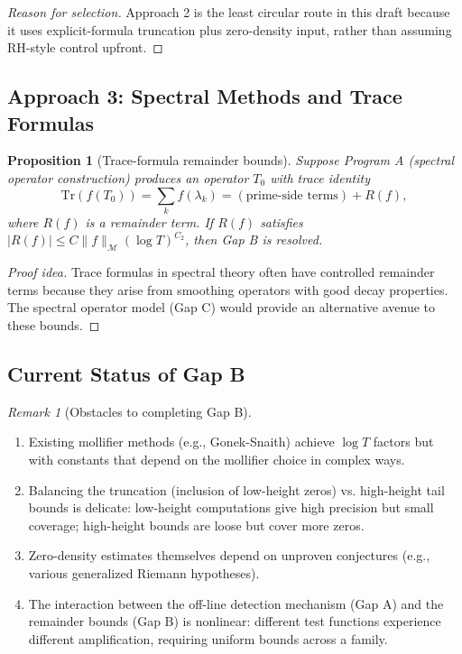 \documentclass[11pt]{article}
\theoremstyle{plain}
\newtheorem{proposition}[theorem]{Proposition}
\theoremstyle{definition}
\theoremstyle{remark}
\newtheorem{remark}[theorem]{Remark}
\begin{document}
\begin{proof}[Reason for selection]
Approach 2 is the least circular route in this draft because it uses explicit-formula truncation plus
zero-density input, rather than assuming RH-style control upfront.
\end{proof}

\subsection{Approach 3: Spectral Methods and Trace Formulas}

\begin{proposition}[Trace-formula remainder bounds]
Suppose Program A (spectral operator construction) produces an operator $T_0$ with trace identity
\[
\text{Tr}(f(T_0)) = \sum_k f(\lambda_k) = (\text{prime-side terms}) + R(f),
\]
where $R(f)$ is a remainder term. If $R(f)$ satisfies $|R(f)|\leq C\|f\|_{\mathcal{M}}(\log T)^{C_2}$,
then Gap B is resolved.
\end{proposition}

\begin{proof}[Proof idea]
Trace formulas in spectral theory often have controlled remainder terms because
they arise from smoothing operators with good decay properties.
The spectral operator model (Gap C) would provide an alternative avenue to these bounds.
\end{proof}

\subsection{Current Status of Gap B}

\begin{remark}[Obstacles to completing Gap B]
\begin{enumerate}
  \item Existing mollifier methods (e.g., Gonek-Snaith) achieve $\log T$ factors but with constants that depend on the mollifier choice in complex ways.

  \item Balancing the truncation (inclusion of low-height zeros) vs. high-height tail bounds is delicate:
  low-height computations give high precision but small coverage; high-height bounds are loose but cover more zeros.

  \item Zero-density estimates themselves depend on unproven conjectures (e.g., various generalized Riemann hypotheses).

  \item The interaction between the off-line detection mechanism (Gap A) and the remainder bounds (Gap B) is nonlinear:
  different test functions experience different amplification, requiring uniform bounds across a family.
\end{enumerate}
\end{remark}
\end{document}
